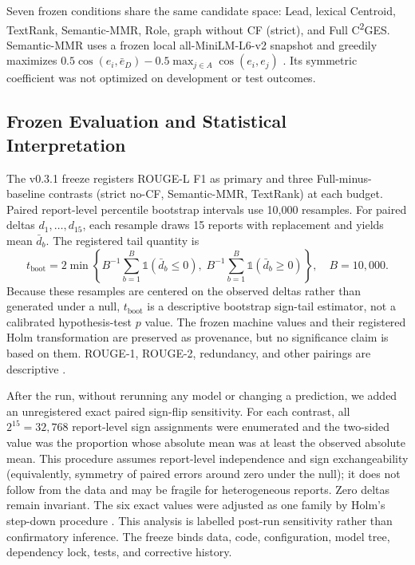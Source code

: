 \documentclass[applsci,article,submit,moreauthors]{Definitions/mdpi}
\newcommand{\cges}{C\textsuperscript{2}GES}
\begin{document}
Seven frozen conditions share the same candidate space: Lead, lexical Centroid, TextRank, Semantic-MMR, Role, graph without CF (strict), and Full \cges{}. Semantic-MMR uses a frozen local all-MiniLM-L6-v2 snapshot and greedily maximizes $0.5\cos(e_i,\bar e_D)-0.5\max_{j\in A}\cos(e_i,e_j)$ \cite{reimers2019sentencebert}. Its symmetric coefficient was not optimized on development or test outcomes.

\subsection{Frozen Evaluation and Statistical Interpretation}

The v0.3.1 freeze registers ROUGE-L F1 as primary and three Full-minus-baseline contrasts (strict no-CF, Semantic-MMR, TextRank) at each budget. Paired report-level percentile bootstrap intervals use 10,000 resamples. For paired deltas $d_1,\ldots,d_{15}$, each resample draws 15 reports with replacement and yields mean $\bar d_b$. The registered tail quantity is
\begin{equation}
t_{\mathrm{boot}}=2\min\left\{B^{-1}\sum_{b=1}^{B}\mathbb{1}(\bar d_b\leq0),\;B^{-1}\sum_{b=1}^{B}\mathbb{1}(\bar d_b\geq0)\right\},\quad B=10{,}000.
\end{equation}
Because these resamples are centered on the observed deltas rather than generated under a null, $t_{\mathrm{boot}}$ is a descriptive bootstrap sign-tail estimator, not a calibrated hypothesis-test $p$ value. The frozen machine values and their registered Holm transformation are preserved as provenance, but no significance claim is based on them. ROUGE-1, ROUGE-2, redundancy, and other pairings are descriptive \cite{cameron2008bootstrap}.

After the run, without rerunning any model or changing a prediction, we added an unregistered exact paired sign-flip sensitivity. For each contrast, all $2^{15}=32{,}768$ report-level sign assignments were enumerated and the two-sided value was the proportion whose absolute mean was at least the observed absolute mean. This procedure assumes report-level independence and sign exchangeability (equivalently, symmetry of paired errors around zero under the null); it does not follow from the data and may be fragile for heterogeneous reports. Zero deltas remain invariant. The six exact values were adjusted as one family by Holm's step-down procedure \cite{holm1979simple}. This analysis is labelled post-run sensitivity rather than confirmatory inference. The freeze binds data, code, configuration, model tree, dependency lock, tests, and corrective history.
\end{document}
